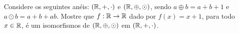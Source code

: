 \documentclass[12pt]{exam}
\begin{document}
\questao{} Considere os seguintes anéis: $(\mathbb{R}, +, \cdot)$ e $(\mathbb{R}, \oplus, \odot)$, sendo $a \oplus b = a + b + 1$ e $a \odot b = a + b + ab$. Mostre que $f : \mathbb{R} \to \mathbb{R}$ dado por $f(x) = x + 1$, para todo $x \in \mathbb{R}$, é um isomorfismos de $(\mathbb{R}, \oplus, \odot)$ em $(\mathbb{R}, +, \cdot)$.

\vspace{.3cm}












\end{document}
